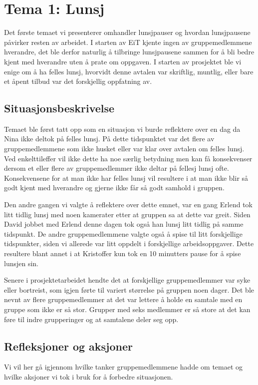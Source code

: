 \chapter{Tema 1: Lunsj}
Det første temaet vi presenterer omhandler lunsjpauser og hvordan lunsjpausene påvirker resten av arbeidet. I starten av EiT kjente ingen av gruppemedlemmene hverandre, det ble derfor naturlig å tilbringe lunsjpausene sammen for å bli bedre kjent med hverandre uten å prate om oppgaven. I starten av prosjektet ble vi enige om å ha felles lunsj, hvorvidt denne avtalen var skriftlig, muntlig, eller bare et åpent tilbud var det forskjellig oppfatning av.

\section{Situasjonsbeskrivelse}
Temaet ble først tatt opp som en situasjon vi burde reflektere over en dag da Nina ikke deltok på felles lunsj. På dette tidspunktet var det flere av gruppemedlemmene som ikke husket eller var klar over avtalen om felles lunsj. Ved enkelttileffer vil ikke dette ha noe særlig betydning men kan få konsekvenser dersom et eller flere av gruppemedlemmer ikke deltar på fellesj lunsj ofte. Konsekvensene for at man ikke har felles lunsj vil resultere i at man ikke blir så godt kjent med hverandre og gjerne ikke får så godt samhold i gruppen. 

Den andre gangen vi valgte å reflektere over dette emnet, var en gang Erlend tok litt tidlig lunsj med noen kamerater etter at gruppen sa at dette var greit. Siden David jobbet med Erlend denne dagen tok også han lunsj litt tidlig på samme tidspunkt. De andre gruppemedlemmene valgte også å spise til litt forskjellige tidspunkter, siden vi allerede var litt oppdelt i forskjellige arbeidsoppgaver. Dette resultere blant annet i at Kristoffer kun tok en 10 minutters pause for å spise lunsjen sin. 

Senere i prosjektetarbeidet hendte det at forskjellige gruppemedlemmer var syke eller bortreist, som igjen førte til variert størrelse på gruppen noen dager.  Det ble nevnt av flere gruppemedlemmer at det var lettere å holde en samtale med en gruppe som ikke er så stor. Grupper med seks medlemmer er så store at det kan føre til indre grupperinger og at samtalene deler seg opp.

\section{Refleksjoner og aksjoner}
Vi vil her gå igjennom hvilke tanker gruppemedlemmene hadde om temaet og hvilke aksjoner vi tok i bruk for å forbedre situasjonen.

